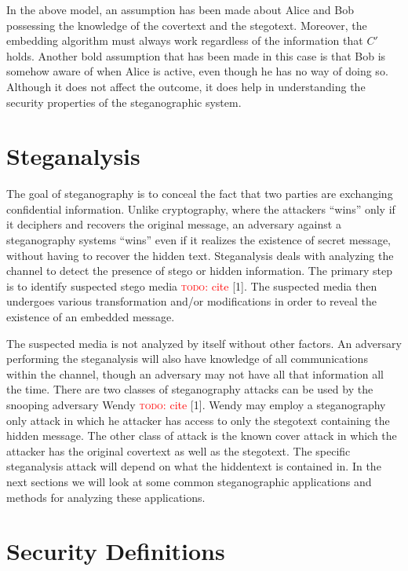 \documentclass[11pt]{article}
\newcommand\todo[1]{\textcolor{red}{\textsc{todo}: #1}}
\begin{document}
In the above model, an assumption has been made about Alice and Bob
possessing the knowledge of the covertext and the stegotext. Moreover,
the embedding algorithm must always work regardless of the information
that $C'$ holds. Another bold assumption that has been made in this case
is that Bob is somehow aware of when Alice is active, even though he
has no way of doing so. Although it does not affect the outcome, it
does help in understanding the security properties of the
steganographic system.

\section{Steganalysis} 
The goal of steganography is to conceal the fact that two parties are
exchanging confidential information. Unlike cryptography, where the
attackers ``wins'' only if it deciphers and recovers the original
message, an adversary against a steganography systems ``wins'' even if
it realizes the existence of secret message, without having to recover
the hidden text. Steganalysis deals with analyzing the channel to
detect the presence of stego or hidden information. The primary step
is to identify suspected stego media \todo{cite} [1]. The suspected media then
undergoes various transformation and/or modifications in order to
reveal the existence of an embedded message. 

The suspected media is not analyzed by itself without other factors.
An adversary performing the steganalysis will also have knowledge of
all communications within the channel, though an adversary may not
have all that information all the time. There are two classes of
steganography attacks can be used by the snooping adversary Wendy
\todo{cite} [1].
Wendy may employ a steganography only attack in which he attacker has
access to only the stegotext containing the hidden message. The other
class of attack is the known cover attack in which the attacker has
the original covertext as well as the stegotext. The specific
steganalysis attack will depend on what the hiddentext is contained
in. In the next sections we will look at some common steganographic
applications and methods for analyzing these applications.

\section{Security Definitions}
\end{document}
